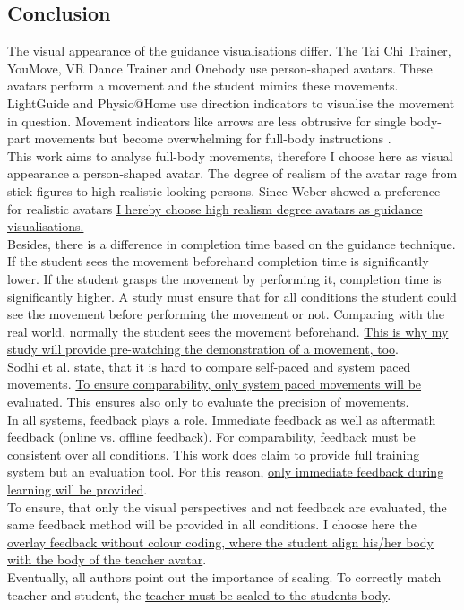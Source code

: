 \subsection{Conclusion}
The visual appearance of the guidance visualisations differ. The Tai Chi Trainer, YouMove, VR Dance Trainer and Onebody use person-shaped avatars. These avatars perform a movement and the student mimics these movements. LightGuide and Physio@Home use direction indicators to visualise the movement in question. Movement indicators like arrows are less obtrusive for single body-part movements but become overwhelming for full-body instructions \cite{Sodhi2012}.\\
This work aims to analyse full-body movements, therefore I choose here as visual appearance a person-shaped avatar. The degree of realism of the avatar rage from stick figures to high realistic-looking persons. Since Weber \cite{Weber2018} showed a preference for realistic avatars \ul{I hereby choose high realism degree avatars as guidance visualisations.}\\
Besides, there is a difference in completion time based on the guidance technique. If the student sees the movement beforehand completion time is significantly lower. If the student grasps the movement by performing it, completion time is significantly higher. A study must ensure that for all conditions the student could see the movement before performing the movement or not. Comparing with the real world, normally the student sees the movement beforehand. \ul{This is why my study will provide pre-watching the demonstration of a movement, too}.\\
Sodhi et al. state, that it is hard to compare self-paced and system paced movements. \ul{To ensure comparability, only system paced movements will be evaluated}. This ensures also only to evaluate the precision of movements.\\
In all systems, feedback plays a role. Immediate feedback as well as aftermath feedback (online vs. offline feedback). For comparability, feedback must be consistent over all conditions. This work does claim to provide full training system but an evaluation tool. For this reason, \ul{only immediate feedback during learning will be provided}.\\
To ensure, that only the visual perspectives and not feedback are evaluated, the same feedback method will be provided in all conditions. I choose here the \ul{overlay feedback without colour coding, where the student align his/her body with the body of the teacher avatar}.\\
Eventually, all authors point out the importance of scaling. To correctly match teacher and student, the \ul{teacher must be scaled to the students body}.


